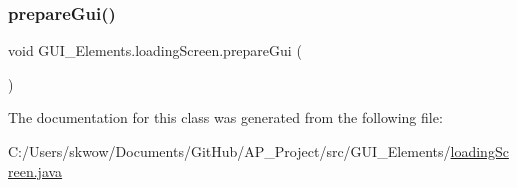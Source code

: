 \hypertarget{class_g_u_i___elements_1_1loading_screen_afa7caf6e03de405b8b9c0d6619bac201}{}\label{class_g_u_i___elements_1_1loading_screen_afa7caf6e03de405b8b9c0d6619bac201} 
\subsubsection{\texorpdfstring{prepare\+Gui()}{prepareGui()}}
{\footnotesize\ttfamily void G\+U\+I\+\_\+\+Elements.\+loading\+Screen.\+prepare\+Gui (\begin{DoxyParamCaption}{ }\end{DoxyParamCaption})}



The documentation for this class was generated from the following file\+:\begin{DoxyCompactItemize}
\item 
C\+:/\+Users/skwow/\+Documents/\+Git\+Hub/\+A\+P\+\_\+\+Project/src/\+G\+U\+I\+\_\+\+Elements/\hyperlink{loading_screen_8java}{loading\+Screen.\+java}\end{DoxyCompactItemize}
